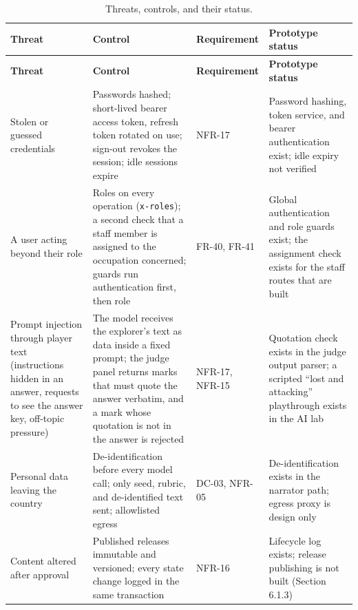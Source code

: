 {\small{}\renewcommand{\arraystretch}{1.1}
\begin{longtable}{|>{\raggedright\arraybackslash}p{}|>{\raggedright\arraybackslash}p{}|>{\raggedright\arraybackslash}p{}|>{\raggedright\arraybackslash}p{}|}
\caption{Threats, controls, and their status.} \\
\hline
\textbf{Threat} & \textbf{Control} & \textbf{Requirement} & \textbf{Prototype status} \\ \hline
\endfirsthead
\hline
\textbf{Threat} & \textbf{Control} & \textbf{Requirement} & \textbf{Prototype status} \\ \hline
\endhead
Stolen or guessed credentials & Passwords hashed; short-lived bearer access token, refresh token rotated on use; sign-out revokes the session; idle sessions expire & NFR-17 & Password hashing, token service, and bearer authentication exist; idle expiry not verified \\ \hline
A user acting beyond their role & Roles on every operation (\texttt{x-\allowbreak{}roles}); a second check that a staff member is assigned to the occupation concerned; guards run authentication first, then role & FR-40, FR-41 & Global authentication and role guards exist; the assignment check exists for the staff routes that are built \\ \hline
Prompt injection through player text (instructions hidden in an answer, requests to see the answer key, off-topic pressure) & The model receives the explorer's text as data inside a fixed prompt; the judge panel returns marks that must quote the answer verbatim, and a mark whose quotation is not in the answer is rejected & NFR-17, NFR-15 & Quotation check exists in the judge output parser; a scripted ``lost and attacking'' playthrough exists in the AI lab \\ \hline
Personal data leaving the country & De-\allowbreak{}identification before every model call; only seed, rubric, and de-\allowbreak{}identified text sent; allowlisted egress & DC-03, NFR-05 & De-\allowbreak{}identification exists in the narrator path; egress proxy is design only \\ \hline
Content altered after approval & Published releases immutable and versioned; every state change logged in the same transaction & NFR-16 & Lifecycle log exists; release publishing is not built (Section 6.1.3) \\ \hline

\end{longtable}}
